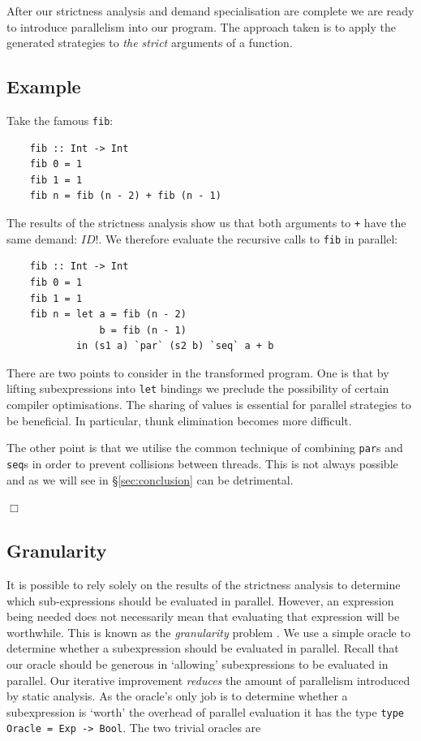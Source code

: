 After our strictness analysis and demand specialisation are complete we are
ready to introduce parallelism into our program. The approach taken is to apply
the generated strategies to \emph{the strict} arguments of a function. 

\subsection*{Example}

Take the famous \verb-fib-:

\begin{verbatim}
    fib :: Int -> Int
    fib 0 = 1
    fib 1 = 1
    fib n = fib (n - 2) + fib (n - 1)
\end{verbatim}

The results of the strictness analysis show us that both arguments to \verb-+-
have the same demand: $ID!$. We therefore evaluate the recursive
calls to \verb-fib- in parallel:

\begin{verbatim}
    fib :: Int -> Int
    fib 0 = 1
    fib 1 = 1
    fib n = let a = fib (n - 2)
                b = fib (n - 1)
            in (s1 a) `par` (s2 b) `seq` a + b
\end{verbatim}

There are two points to consider in the transformed program. One is that by lifting
subexpressions into \verb-let- bindings we preclude the possibility of certain compiler
optimisations. The sharing of values is essential for parallel strategies to be beneficial.
In particular, thunk elimination becomes more difficult.

The other point is that we utilise the common technique of combining \verb-par-s
and \verb-seq-s in order to prevent collisions between threads. This is not always
possible and as we will see in \S \ref{sec:conclusion} can be detrimental.

\hfill$\Box$

\subsection{Granularity}

It is possible to rely solely on the results of the strictness analysis to
determine which sub-expressions should be evaluated in parallel. However, an
expression being needed does not necessarily mean that evaluating that
expression will be worthwhile. This is known as the \emph{granularity} problem
\citep{hammond2000research}. We use a simple oracle to determine whether a
subexpression should be evaluated in parallel. Recall that our oracle should be
generous in `allowing' subexpressions to be evaluated in parallel. Our
iterative improvement \emph{reduces} the amount of parallelism introduced by
static analysis. As the oracle's only job is to determine whether a
subexpression is `worth' the overhead of parallel evaluation it has the type
\verb+type Oracle = Exp -> Bool+. The two trivial oracles are

